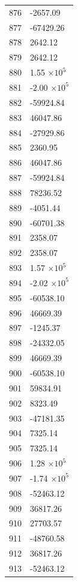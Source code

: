 \documentclass[a4paper,11pt]{article}
\begin{document}
\begin{center}
\begin{longtable}{|R{1.5cm}|R{2.6cm}|}
  876 &     -2657.09 \\
  877 &    -67429.26 \\
  878 &      2642.12 \\
  879 &      2642.12 \\
  880 &         1.55 $\times 10^{           5}$ \\
  881 &        -2.00 $\times 10^{           5}$ \\
  882 &    -59924.84 \\
  883 &     46047.86 \\
  884 &    -27929.86 \\
  885 &      2360.95 \\
  886 &     46047.86 \\
  887 &    -59924.84 \\
  888 &     78236.52 \\
  889 &     -4051.44 \\
  890 &    -60701.38 \\
  891 &      2358.07 \\
  892 &      2358.07 \\
 {\color{OliveGreen} 893} & {\color{OliveGreen}        1.57 $\times 10^{           5}$} \\
  894 &        -2.02 $\times 10^{           5}$ \\
  895 &    -60538.10 \\
  896 &     46669.39 \\
  897 &     -1245.37 \\
  898 &    -24332.05 \\
  899 &     46669.39 \\
  900 &    -60538.10 \\
  901 &     59834.91 \\
  902 &      8323.49 \\
  903 &    -47181.35 \\
  904 &      7325.14 \\
  905 &      7325.14 \\
  906 &         1.28 $\times 10^{           5}$ \\
  907 &        -1.74 $\times 10^{           5}$ \\
  908 &    -52463.12 \\
  909 &     36817.26 \\
  910 &     27703.57 \\
  911 &    -48760.58 \\
  912 &     36817.26 \\
  913 &    -52463.12 \\

\end{longtable}
\end{center}
\end{document}
